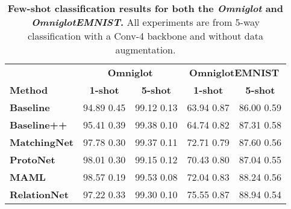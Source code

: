 \documentclass{article}
\begin{document}
\begin{table}[h]
\centering
\caption{\textbf{Few-shot classification results for both the \textit{Omniglot} and \textit{OmniglotEMNIST}.} All experiments are from 5-way classification with a Conv-4 backbone and without data augmentation. }

\label{tab:omni_cchar}
\begin{tabular}{lcccc}
\toprule
\textbf{}             & \multicolumn{2}{c}{\textbf{Omniglot}}        & \multicolumn{2}{c}{\textbf{OmniglotEMNIST}}                \\
\small{\textbf{Method}}             & \textbf{1-shot}    & \textbf{5-shot}    & \textbf{1-shot}    & \textbf{5-shot}    \\ \midrule
\small{\textbf{Baseline    }}& \small{94.89  0.45} & \small{99.12  0.13} & \small{63.94  0.87} & \small{86.00  0.59} \\
\small{\textbf{Baseline++  }}& \small{95.41  0.39} & \small{99.38  0.10} & \small{64.74  0.82} & \small{87.31  0.58} \\ \midrule
\small{\textbf{MatchingNet }}& \small{97.78  0.30} & \small{99.37  0.11} & \small{72.71  0.79} & \small{87.60  0.56} \\
\small{\textbf{ProtoNet    }}& \small{98.01  0.30} & \small{99.15  0.12} & \small{70.43  0.80} & \small{87.04  0.55} \\
\small{\textbf{MAML        }}& \small{98.57  0.19} & \small{99.53  0.08} & \small{72.04  0.83} & \small{88.24  0.56} \\
\small{\textbf{RelationNet }}& \small{97.22  0.33} & \small{99.30  0.10} & \small{75.55  0.87} & \small{88.94  0.54} \\ \bottomrule
\end{tabular}
\vspace{-0.25cm}
\end{table}
 
\end{document}
